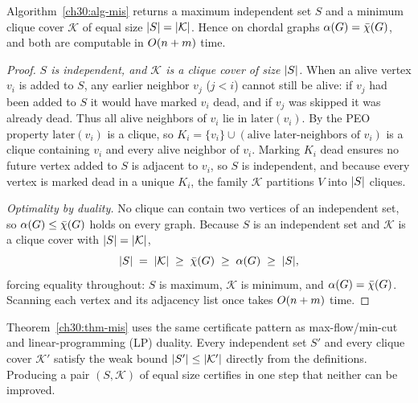 \begin{theorem}\label{ch30:thm-mis}
Algorithm~\ref{ch30:alg-mis} returns a maximum independent set $S$ and a minimum clique cover $\mathcal{K}$ of equal size $\lvert S\rvert=\lvert\mathcal{K}\rvert$. Hence on chordal graphs $\alpha(G)=\bar\chi(G)$, and both are computable in $O(n+m)$ time.
\end{theorem}

\begin{proof}
\emph{$S$ is independent, and $\mathcal{K}$ is a clique cover of size $\lvert S\rvert$.} When an alive vertex $v_i$ is added to $S$, any earlier neighbor $v_j$ ($j<i$) cannot still be alive: if $v_j$ had been added to $S$ it would have marked $v_i$ dead, and if $v_j$ was skipped it was already dead. Thus all alive neighbors of $v_i$ lie in $\mathrm{later}(v_i)$. By the PEO property $\mathrm{later}(v_i)$ is a clique, so $K_i=\{v_i\}\cup(\text{alive later-neighbors of }v_i)$ is a clique containing $v_i$ and every alive neighbor of $v_i$. Marking $K_i$ dead ensures no future vertex added to $S$ is adjacent to $v_i$, so $S$ is independent, and because every vertex is marked dead in a unique $K_i$, the family $\mathcal{K}$ partitions $V$ into $\lvert S\rvert$ cliques.

\emph{Optimality by duality.} No clique can contain two vertices of an independent set, so $\alpha(G)\le\bar\chi(G)$ holds on every graph. Because $S$ is an independent set and $\mathcal{K}$ is a clique cover with $\lvert S\rvert=\lvert\mathcal{K}\rvert$,
\[
  \lvert S\rvert \;=\; \lvert\mathcal{K}\rvert \;\ge\; \bar\chi(G) \;\ge\; \alpha(G) \;\ge\; \lvert S\rvert,
\]
forcing equality throughout: $S$ is maximum, $\mathcal{K}$ is minimum, and $\alpha(G)=\bar\chi(G)$. Scanning each vertex and its adjacency list once takes $O(n+m)$ time.
\end{proof}

\begin{whybox}
Theorem~\ref{ch30:thm-mis} uses the same certificate pattern as max-flow/min-cut and linear-programming (LP) duality. Every independent set $S'$ and every clique cover $\mathcal{K}'$ satisfy the weak bound $\lvert S'\rvert\le\lvert\mathcal{K}'\rvert$ directly from the definitions. Producing a pair $(S,\mathcal{K})$ of equal size certifies in one step that neither can be improved.
\end{whybox}

